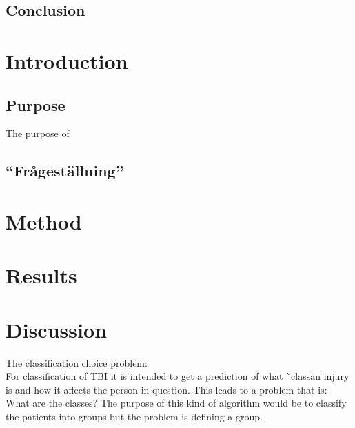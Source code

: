 \documentclass[11pt]{article}
\begin{document}
\subsection*{Conclusion}

\tableofcontents

\section{Introduction}

\subsection{Purpose}
The purpose of


\subsection{``Frågeställning''}

\section{Method}

\section{Results}

\section{Discussion}
The classification choice problem:\\
For classification of TBI it is intended to get a prediction of what \``class\" an injury is and how it affects the person in question. This leads to a problem that is: What are the classes? The purpose of this kind of algorithm would be to classify the patients into groups but the problem is defining a group.
\end{document}
